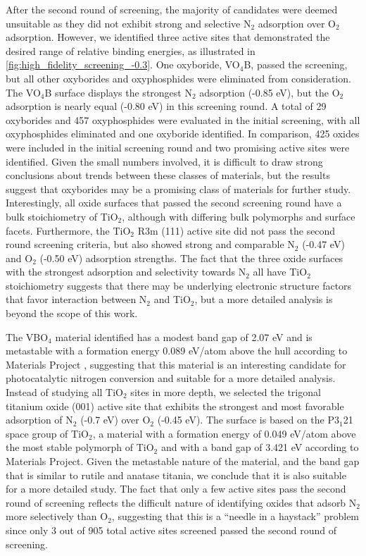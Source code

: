 After the second round of screening, the majority of candidates were deemed unsuitable as they did not exhibit strong and selective N$_2$ adsorption over O$_2$ adsorption. However, we identified three active sites that demonstrated the desired range of relative binding energies, as illustrated in \ref{fig:high_fidelity_screening_-0.3}. 
One oxyboride, VO$_4$B, passed the screening, but all other oxyborides and oxyphosphides were eliminated from consideration. The VO$_4$B surface displays the strongest N$_2$ adsorption (-0.85 eV), but the O$_2$ adsorption is nearly equal (-0.80 eV) in this screening round. 
A total of 29 oxyborides and 457 oxyphosphides were evaluated in the initial screening, with all oxyphosphides eliminated and one oxyboride identified. In comparison, 425 oxides were included in the initial screening round and two promising active sites were identified. Given the small numbers involved, it is difficult to draw strong conclusions about trends between these classes of materials, but the results suggest that oxyborides may be a promising class of materials for further study. Interestingly, all oxide surfaces that passed the second screening round have a bulk stoichiometry of TiO$_2$, although with differing bulk polymorphs and surface facets. Furthermore, the TiO$_2$ R3m (111) active site did not pass the second round screening criteria, but also showed strong and comparable N$_2$ (-0.47 eV) and O$_2$ (-0.50 eV) adsorption strengths. The fact that the three oxide surfaces with the strongest adsorption and selectivity towards N$_2$ all have TiO$_2$ stoichiometry suggests that there may be underlying electronic structure factors that favor interaction between N$_2$ and TiO$_2$, but a more detailed analysis is beyond the scope of this work.


The VBO$_4$ material identified has a modest band gap of 2.07 eV and is metastable with a formation energy 0.089 eV/atom above the hull according to Materials Project \cite{VBO4}, suggesting that this material is an interesting candidate for photocatalytic nitrogen conversion and suitable for a more detailed analysis. Instead of studying all TiO$_2$ sites in more depth, we selected the trigonal titanium oxide (001) active site that exhibits the strongest and most favorable adsorption of N$_2$ (-0.7 eV) over O$_2$ (-0.45 eV). The surface is based on the P3$_1$21 space group of TiO$_2$, a material with a formation energy of 0.049 eV/atom above the most stable polymorph of TiO$_2$ and with a band gap of 3.421 eV according to Materials Project. Given the metastable nature of the material, and the band gap that is similar to rutile and anatase titania, we conclude that it is also suitable for a more detailed study. The fact that only a few active sites pass the second round of screening reflects the difficult nature of identifying oxides that adsorb N$_2$ more selectively than O$_2$, suggesting that this is a ``needle in a haystack'' problem since only 3 out of 905 total active sites screened passed the second round of screening. 

